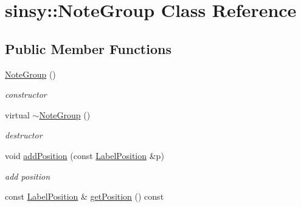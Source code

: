 \hypertarget{classsinsy_1_1NoteGroup}{\section{sinsy\-:\-:\-Note\-Group \-Class \-Reference}
\label{classsinsy_1_1NoteGroup}
}
\subsection*{\-Public \-Member \-Functions}
\begin{DoxyCompactItemize}
\item 
\hypertarget{classsinsy_1_1NoteGroup_ac87afe50423a143748094a2a8231fa4c}{\hyperlink{classsinsy_1_1NoteGroup_ac87afe50423a143748094a2a8231fa4c}{\-Note\-Group} ()}\label{classsinsy_1_1NoteGroup_ac87afe50423a143748094a2a8231fa4c}

\begin{DoxyCompactList}\small\item\em constructor \end{DoxyCompactList}\item 
\hypertarget{classsinsy_1_1NoteGroup_aeb30350c0cb9c25fa4ddc5e0a731a6da}{virtual \hyperlink{classsinsy_1_1NoteGroup_aeb30350c0cb9c25fa4ddc5e0a731a6da}{$\sim$\-Note\-Group} ()}\label{classsinsy_1_1NoteGroup_aeb30350c0cb9c25fa4ddc5e0a731a6da}

\begin{DoxyCompactList}\small\item\em destructor \end{DoxyCompactList}\item 
\hypertarget{classsinsy_1_1NoteGroup_a26f59e76efd9016e15bd17d5c83dd6ec}{void \hyperlink{classsinsy_1_1NoteGroup_a26f59e76efd9016e15bd17d5c83dd6ec}{add\-Position} (const \hyperlink{classsinsy_1_1LabelPosition}{\-Label\-Position} \&p)}\label{classsinsy_1_1NoteGroup_a26f59e76efd9016e15bd17d5c83dd6ec}

\begin{DoxyCompactList}\small\item\em add position \end{DoxyCompactList}\item 
\hypertarget{classsinsy_1_1NoteGroup_ad85c183b51866413aec77a5f8cbdd0f0}{const \hyperlink{classsinsy_1_1LabelPosition}{\-Label\-Position} \& \hyperlink{classsinsy_1_1NoteGroup_ad85c183b51866413aec77a5f8cbdd0f0}{get\-Position} () const }\label{classsinsy_1_1NoteGroup_ad85c183b51866413aec77a5f8cbdd0f0}


\end{DoxyCompactItemize}
